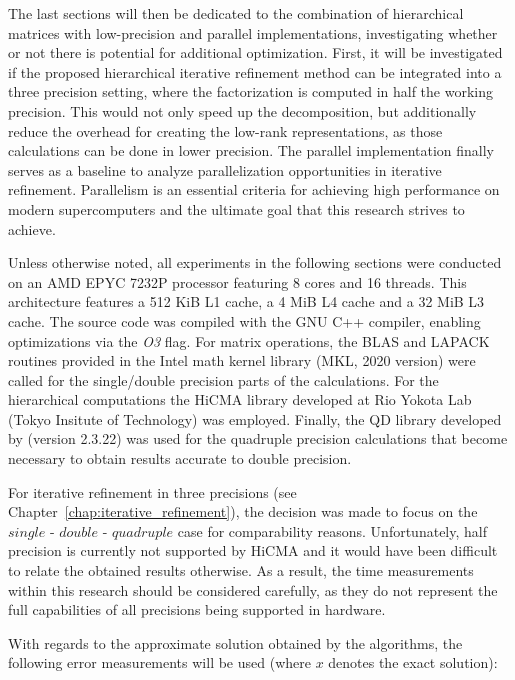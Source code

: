 The last sections will then be dedicated to the combination of hierarchical matrices with low-precision and parallel implementations, investigating whether or not there is potential for additional optimization. First, it will be investigated if the proposed hierarchical iterative refinement method can be integrated into a three precision setting, where the factorization is computed in half the working precision. This would not only speed up the decomposition, but additionally reduce the overhead for creating the low-rank representations, as those calculations can be done in lower precision. The parallel implementation finally serves as a baseline to analyze parallelization opportunities in iterative refinement. Parallelism is an essential criteria for achieving high performance on modern supercomputers and the ultimate goal that this research strives to achieve.

Unless otherwise noted, all experiments in the following sections were conducted on an AMD EPYC 7232P processor featuring 8 cores and 16 threads. This architecture features a 512 KiB L1 cache, a 4 MiB L4 cache and a 32 MiB L3 cache. The source code was compiled with the GNU C++ compiler, enabling optimizations via the \textit{O3} flag. For matrix operations, the BLAS and LAPACK routines provided in the Intel math kernel library (MKL, 2020 version) were called for the single/double precision parts of the calculations. For the hierarchical computations the HiCMA library developed at Rio Yokota Lab (Tokyo Insitute of Technology) was employed. Finally, the QD library developed by \cite{hida_quad-double_2001} (version 2.3.22) was used for the quadruple precision calculations that become necessary to obtain results accurate to double precision.

For iterative refinement in three precisions (see Chapter~\hyperref[chap:iterative_refinemen]{\ref{chap:iterative_refinement}}), the decision was made to focus on the $single$ - $double$ - $quadruple$ case for comparability reasons. Unfortunately, half precision is currently not supported by HiCMA and it would have been difficult to relate the obtained results otherwise. As a result, the time measurements within this research should be considered carefully, as they do not represent the full capabilities of all precisions being supported in hardware.

With regards to the approximate solution obtained by the algorithms, the following error measurements will be used (where $x$ denotes the exact solution):

